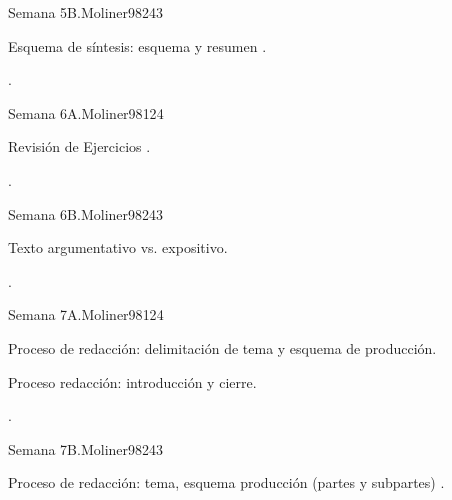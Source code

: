 \begin{syllabus}
\begin{unit}{Semana 5B.}{}{Moliner98}{24}{3}
   \begin{topics}
      \item Esquema de síntesis: esquema y resumen .
   \end{topics}

   \begin{learningoutcomes}
      \item .
      \end{learningoutcomes}
\end{unit}

\begin{unit}{Semana 6A.}{}{Moliner98}{12}{4}
   \begin{topics}
      \item Revisión de Ejercicios .
   \end{topics}
   \begin{learningoutcomes}
      \item .
   \end{learningoutcomes}
\end{unit}

\begin{unit}{Semana 6B.}{}{Moliner98}{24}{3}
   \begin{topics}
      \item Texto argumentativo vs. expositivo.
   \end{topics}

   \begin{learningoutcomes}
      \item . 
      \end{learningoutcomes}
\end{unit}

\begin{unit}{Semana 7A.}{}{Moliner98}{12}{4}
   \begin{topics}
      \item Proceso de redacción: delimitación de tema y esquema de producción.
      \item Proceso redacción: introducción y cierre.
   \end{topics}
   \begin{learningoutcomes}
      \item .
   \end{learningoutcomes}
\end{unit}

\begin{unit}{Semana 7B.}{}{Moliner98}{24}{3}
   \begin{topics}
      \item Proceso de redacción: tema, esquema producción (partes y subpartes) . 
   \end{topics}


\end{unit}
\end{syllabus}
